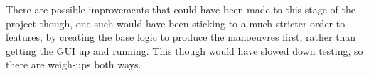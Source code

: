 There are possible improvements that could have been made to this stage of the project though, one such would have been sticking to a much stricter order to features, by creating the base logic to produce the manoeuvres first, rather than getting the GUI up and running. This though would have slowed down testing, so there are weigh-ups both ways.

